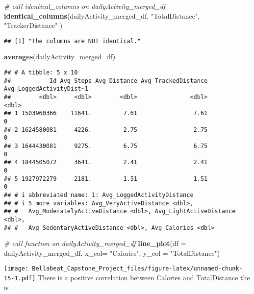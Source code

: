 \documentclass[
]{article}
\newenvironment{Shaded}{\begin{snugshade}}{\end{snugshade}}
\newcommand{\AttributeTok}[1]{\textcolor[rgb]{0.13,0.29,0.53}{#1}}
\newcommand{\CommentTok}[1]{\textcolor[rgb]{0.56,0.35,0.01}{\textit{#1}}}
\newcommand{\FunctionTok}[1]{\textcolor[rgb]{0.13,0.29,0.53}{\textbf{#1}}}
\newcommand{\NormalTok}[1]{#1}
\newcommand{\StringTok}[1]{\textcolor[rgb]{0.31,0.60,0.02}{#1}}
\begin{document}
\begin{Shaded}
\begin{Highlighting}[]
\CommentTok{\# call identical\_columns on dailyActivity\_merged\_df}
\FunctionTok{identical\_columns}\NormalTok{(dailyActivity\_merged\_df, }\StringTok{"TotalDistance"}\NormalTok{, }\StringTok{"TrackerDistance"}\NormalTok{ )}
\end{Highlighting}
\end{Shaded}

\begin{verbatim}
## [1] "The columns are NOT identical."
\end{verbatim}

\begin{Shaded}
\begin{Highlighting}[]
\FunctionTok{averages}\NormalTok{(dailyActivity\_merged\_df)}
\end{Highlighting}
\end{Shaded}

\begin{verbatim}
## # A tibble: 5 x 10
##           Id Avg_Steps Avg_Distance Avg_TrackedDistance Avg_LoggedActivityDist~1
##        <dbl>     <dbl>        <dbl>               <dbl>                    <dbl>
## 1 1503960366    11641.         7.61                7.61                        0
## 2 1624580081     4226.         2.75                2.75                        0
## 3 1644430081     9275.         6.75                6.75                        0
## 4 1844505072     3641.         2.41                2.41                        0
## 5 1927972279     2181.         1.51                1.51                        0
## # i abbreviated name: 1: Avg_LoggedActivityDistance
## # i 5 more variables: Avg_VeryActiveDistance <dbl>,
## #   Avg_ModeratelyActiveDistance <dbl>, Avg_LightActiveDistance <dbl>,
## #   Avg_SedentaryActiveDistance <dbl>, Avg_Calories <dbl>
\end{verbatim}

\begin{Shaded}
\begin{Highlighting}[]
\CommentTok{\# call function on dailyActivity\_merged\_df }
\FunctionTok{line\_plot}\NormalTok{(}\AttributeTok{df =}\NormalTok{ dailyActivity\_merged\_df, }\AttributeTok{x\_col=} \StringTok{"Calories"}\NormalTok{, }\AttributeTok{y\_col =} \StringTok{"TotalDistance"}\NormalTok{)}
\end{Highlighting}
\end{Shaded}

\texttt{[image: Bellabeat\_Capstone\_Project\_files/figure-latex/unnamed-chunk-15-1.pdf]}
There is a positive correlation between Calories and TotalDistance the
is
\end{document}
